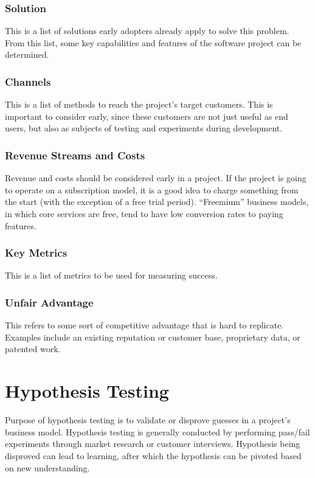 \documentclass[12pt,titlepage]{article}
\begin{document}
      \subsubsection{Solution}
        This is a list of solutions early adopters already apply to solve this problem. From this list, some key capabilities and features
        of the software project can be determined.

      \subsubsection{Channels}
        This is a list of methods to reach the project's target customers. This is important to consider early, since these customers
        are not just useful as end users, but also as subjects of testing and experiments during development.

      \subsubsection{Revenue Streams and Costs}
        Revenue and costs should be considered early in a project. If the project is going to operate on a subscription model, it is
        a good idea to charge something from the start (with the exception of a free trial period). ``Freemium'' business models, in
        which core services are free, tend to have low conversion rates to paying features.

      \subsubsection{Key Metrics}
        This is a list of metrics to be used for measuring success.

      \subsubsection{Unfair Advantage}
        This refers to some sort of competitive advantage that is hard to replicate. Examples include an existing reputation or customer
        base, proprietary data, or patented work.

  \section{Hypothesis Testing}
    Purpose of hypothesis testing is to validate or disprove guesses in a project's business model. Hypothesis testing is generally
    conducted by performing pass/fail experiments through market research or customer interviews. Hypothesis being disproved can lead
    to learning, after which the hypothesis can be pivoted based on new understanding.
\end{document}
